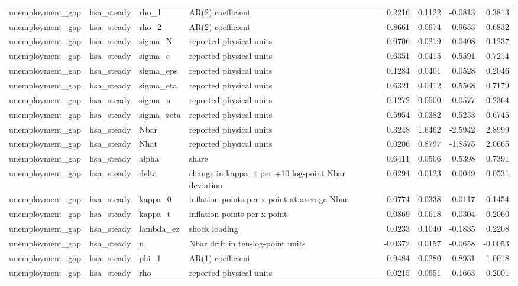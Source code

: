 \begin{tabular}{llllrrrr}
unemployment\_gap & hsa\_steady & rho\_1 & AR(2) coefficient & 0.2216 & 0.1122 & -0.0813 & 0.3813 \\
unemployment\_gap & hsa\_steady & rho\_2 & AR(2) coefficient & -0.8661 & 0.0974 & -0.9653 & -0.6832 \\
unemployment\_gap & hsa\_steady & sigma\_N & reported physical units & 0.0706 & 0.0219 & 0.0408 & 0.1237 \\
unemployment\_gap & hsa\_steady & sigma\_e & reported physical units & 0.6351 & 0.0415 & 0.5591 & 0.7214 \\
unemployment\_gap & hsa\_steady & sigma\_eps & reported physical units & 0.1284 & 0.0401 & 0.0528 & 0.2046 \\
unemployment\_gap & hsa\_steady & sigma\_eta & reported physical units & 0.6321 & 0.0412 & 0.5568 & 0.7179 \\
unemployment\_gap & hsa\_steady & sigma\_u & reported physical units & 0.1272 & 0.0500 & 0.0577 & 0.2364 \\
unemployment\_gap & hsa\_steady & sigma\_zeta & reported physical units & 0.5954 & 0.0382 & 0.5253 & 0.6745 \\
unemployment\_gap & hsa\_steady & Nbar & reported physical units & 0.3248 & 1.6462 & -2.5942 & 2.8999 \\
unemployment\_gap & hsa\_steady & Nhat & reported physical units & 0.0206 & 0.8797 & -1.8575 & 2.0665 \\
unemployment\_gap & hsa\_steady & alpha & share & 0.6411 & 0.0506 & 0.5398 & 0.7391 \\
unemployment\_gap & hsa\_steady & delta & change in kappa\_t per +10 log-point Nbar deviation & 0.0294 & 0.0123 & 0.0049 & 0.0531 \\
unemployment\_gap & hsa\_steady & kappa\_0 & inflation points per x point at average Nbar & 0.0774 & 0.0338 & 0.0117 & 0.1454 \\
unemployment\_gap & hsa\_steady & kappa\_t & inflation points per x point & 0.0869 & 0.0618 & -0.0304 & 0.2060 \\
unemployment\_gap & hsa\_steady & lambda\_ez & shock loading & 0.0233 & 0.1040 & -0.1835 & 0.2208 \\
unemployment\_gap & hsa\_steady & n & Nbar drift in ten-log-point units & -0.0372 & 0.0157 & -0.0658 & -0.0053 \\
unemployment\_gap & hsa\_steady & phi\_1 & AR(1) coefficient & 0.9484 & 0.0280 & 0.8931 & 1.0018 \\
unemployment\_gap & hsa\_steady & rho & reported physical units & 0.0215 & 0.0951 & -0.1663 & 0.2001 \\

\end{tabular}
